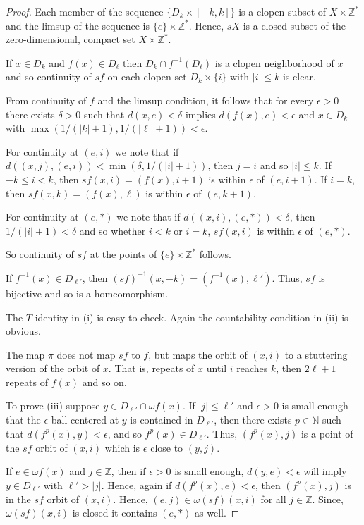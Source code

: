 \documentclass[12pt]{amsart}
\def \N {\mathbb N}
\def \Z {\mathbb Z}
\def \ep {\epsilon}
\def \om {\omega}
\def \d {\delta}
\numberwithin{equation}{section}
\begin{document}
\begin{proof}  Each member of the sequence $\{ D_k \times [-k,k] \}$ is a clopen subset of $X \times \Z^*$
and the limsup of the sequence is $\{ e \}\times \Z^*$.
Hence, $sX$ is a closed subset of the zero-dimensional, compact set $X \times \Z^*$.

If $x \in D_k$ and $f(x) \in D_{\ell}$ then $D_k \cap f^{-1}(D_{\ell})$ is a clopen neighborhood of $x$ and so
continuity of $sf$ on each clopen set $D_k \times \{ i \}$ with $|i| \le k$ is clear.

From continuity of $f$ and the limsup condition, it
follows that for every $\ep > 0$  there exists $\d > 0$ such that
$d(x,e) < \d$ implies $d(f(x),e) < \ep$ and $x \in D_k$ with $\max(1/(|k| + 1), 1/(|\ell| + 1)) < \ep$.

For continuity at $(e,i)$ we note that if $d((x,j),(e,i)) < \min(\d, 1/(|i|+1))$,
then $j = i$ and so $|i| \le k$.  If $-k \le i < k$, then
$sf(x,i) = (f(x),i+1)$ is within $\ep$ of $(e,i+1)$. If $i = k$, then $sf(x,k) = (f(x),\ell)$ is within $\ep$ of $(e,k+1)$.

For continuity at $(e, *)$ we note that if $d((x,i),(e,*)) < \d$,
then $1/(|i|+1) < \d$ and so whether $i < k$ or $i = k$, $sf(x,i)$  is within $\ep$ of $(e,*)$.

So continuity of $sf$ at the points of $\{ e \}\times \Z^*$ follows.

If  $f^{-1}(x) \in D_{\ell'}$, then $(sf)^{-1}(x,-k) = (f^{-1}(x),\ell')$. Thus, $sf$ is bijective and so is
a homeomorphism.

The $T$ identity in (i) is easy to check. Again the countability condition in (ii)  is obvious.

The map $\pi$ does not map $sf$ to $f$, but maps the orbit of $(x,i)$ to a stuttering version of the orbit of $x$. That is, repeats of
$x$ until $i$ reaches $k$, then $2 \ell + 1$ repeats of $f(x)$ and so on.

To prove (iii) suppose $y \in D_{\ell'} \cap \om f(x)$. If $|j| \le \ell'$ and $\ep > 0$ is small enough that the $\ep$ ball centered at $y$ is contained
in $D_{\ell'}$, then there exists $p\in \N$ such that $d(f^p(x),y) < \ep$, and so $f^p(x) \in D_{\ell'}$. Thus, $(f^p(x),j)$ is a point of the $sf$
orbit of $(x,i)$ which is $\ep$ close to $(y,j)$.

If $e \in \om f(x)$ and $j \in \Z$, then if $\ep > 0$ is small enough, $d(y,e) < \ep$ will imply $y \in D_{\ell'}$
with $\ell' > |j|$. Hence, again if $d(f^p(x),e) < \ep$, then $(f^p(x),j)$ is in the $sf$ orbit of $(x,i)$. Hence, $(e,j) \in \om (sf)(x,i) $
for all $j \in \Z$. Since, $\om (sf)(x,i)$ is closed it contains $(e,*)$ as well.


\end{proof}
\end{document}
